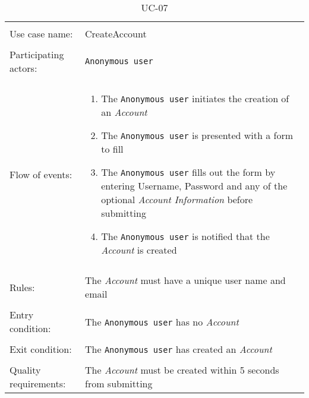 \noindent
\begin{table}[h!]
\caption{UC-07}
\label{UC-07}
\centering
\begin{tabular}{ l p{8cm} } 
\hline       
\\                
Use case name:  & CreateAccount   \\   \hline  \\              
Participating actors:  & \texttt{Anonymous user} \\   \hline \\
Flow of events: & \begin{enumerate}
\item{The \texttt{Anonymous user} initiates the creation of an \textit{Account}}
\item{The \texttt{Anonymous user} is presented with a form to fill}
\item{The \texttt{Anonymous user} fills out the form by entering Username, Password and any of the optional \textit{Account Information} before submitting} %
\item{The \texttt{Anonymous user} is notified that the \textit{Account} is created}
\end{enumerate}
\\   \hline \\
Rules: & The \textit{Account} must have a unique user name and email \\ \hline \\
Entry condition: & The \texttt{Anonymous user} has no \textit{Account} \\ \hline \\
Exit condition: & The \texttt{Anonymous user} has created an \textit{Account} \\ \hline \\
Quality requirements: & The \textit{Account} must be created within 5 seconds from submitting \\  \hline      
\end{tabular} \\
\end{table}

